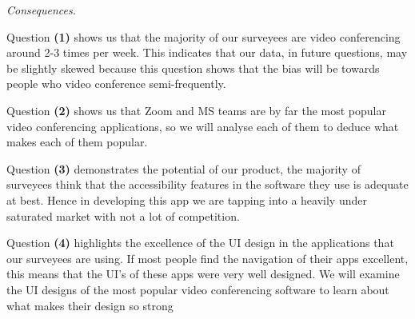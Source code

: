 
\vspace{1em}

\small

\textit{Consequences.} \\ \vspace{0.1cm}

Question \textbf{(1)} shows us that
the majority of our surveyees are video conferencing around
2-3 times per week. This indicates that our data, in future
questions, may be slightly skewed because this question shows
that the bias will be towards people who video conference
semi-frequently. \\ \vspace{0.2cm}

Question \textbf{(2)} shows us that Zoom and MS teams are by
far the most popular video conferencing applications, so we
will analyse each of them to deduce what makes each of them
popular.\\ \vspace{0.2cm}

Question \textbf{(3)} demonstrates the potential of our
product, the majority of surveyees think that the
accessibility features in the software they use is adequate
at best. Hence in developing this app we are tapping into
a heavily under saturated market with not a lot of
competition. \\ \vspace{0.2cm}

Question \textbf{(4)} highlights the excellence of the UI
design in the applications that our surveyees are using.
If most people find the navigation of their apps excellent,
this means that the UI's of these apps were very well
designed. We will examine the UI designs of the most
popular video conferencing software to learn about what
makes their design so strong \\ \vspace{0.2cm}

